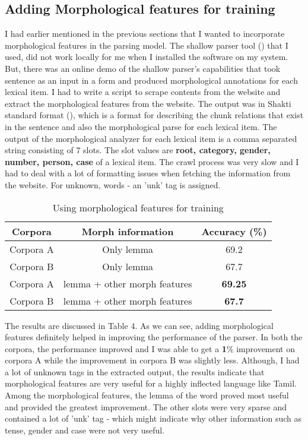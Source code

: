 \documentclass[11pt,letterpaper]{article}
\begin{document}
\subsection{Adding Morphological features for training}

I had earlier mentioned in the previous sections that I wanted to incorporate morphological features in the parsing model. The shallow parser tool (\cite{tamShallowParser}) that I used, did not work
locally for me when I installed the software on my system. But, there was an online demo of the shallow parser's capabilities that took sentence as an input in a
form and produced morphological annotations for each lexical item. I had to write a script to scrape contents from the website and extract the morphological features 
from the website. The output was in Shakti standard format (\cite{bharati2007ssf}), which is a format for describing the chunk relations that exist in the sentence
and also the morphological parse for each lexical item. The output of the morphological analyzer for each lexical item is a comma separated string consisting of 7 slots.
The slot values are \textbf{root, category, gender, number, person, case} of a lexical item. The crawl process was very slow and I had to deal with a lot of
formatting issues when fetching the information from the website. For unknown, words - an 'unk' tag is assigned.\\

\begin{table}
\begin{center}
  \begin{tabular}{ c ||  c || c}
  \hline
  Corpora & Morph information & Accuracy (\%)\\
  \hline
  Corpora A & Only lemma & 69.2 \\
  Corpora B & Only lemma & 67.7\\
  Corpora A & lemma + other morph features & \textbf{69.25}\\
  Corpora B & lemma + other morph features & \textbf{67.7}\\ 
  \hline
   \end{tabular}
\end{center}
\caption{Using morphological features for training}
\label{First}
\end{table}

The results are discussed in Table 4. As we can see, adding morphological features definitely helped in improving the performance of the parser. In both the corpora, 
the performance improved and I was able to get a \textbf{1}\% improvement on corpora A while the improvement in corpora B was slightly less. 
Although, I had a lot of unknown tags in the extracted output, the results indicate that morphological features are very useful for a highly inflected language
like Tamil. Among the morphological features, the lemma of the word proved most useful and provided the greatest improvement. The other slots were very sparse
and contained a lot of 'unk' tag - which might indicate why other information such as tense, gender and case were not very useful.
\end{document}

